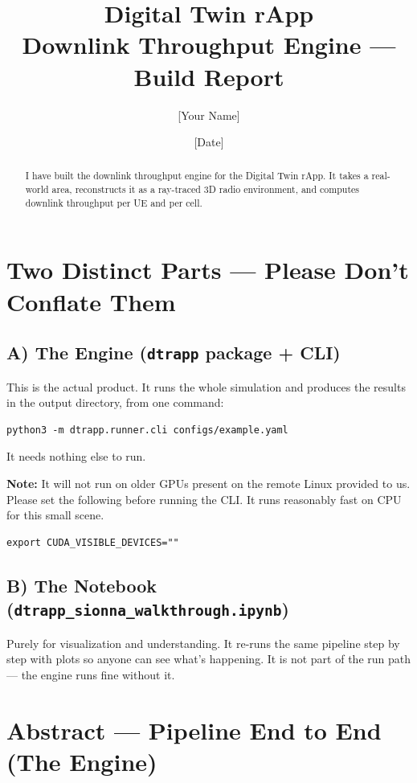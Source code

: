 \documentclass[11pt]{article}
\title{Digital Twin rApp\\[2pt]\large Downlink Throughput Engine --- Build Report}
\author{[Your Name] \\ [Team / Group]}
\date{[Date]}
\begin{document}
\maketitle

\begin{abstract}
I have built the downlink throughput engine for the Digital Twin rApp. It takes a
real-world area, reconstructs it as a ray-traced 3D radio environment, and
computes downlink throughput per UE and per cell.
\end{abstract}

\section{Two Distinct Parts --- Please Don't Conflate Them}

\subsection*{A) The Engine (\texttt{dtrapp} package + CLI)}
This is the actual product. It runs the whole simulation and produces the results
in the output directory, from one command:
\begin{verbatim}
python3 -m dtrapp.runner.cli configs/example.yaml
\end{verbatim}
It needs nothing else to run.

\smallskip
\noindent\textbf{Note:} It will not run on older GPUs present on the remote Linux
provided to us. Please set the following before running the CLI. It runs
reasonably fast on CPU for this small scene.
\begin{verbatim}
export CUDA_VISIBLE_DEVICES=""
\end{verbatim}

\subsection*{B) The Notebook (\texttt{dtrapp\_sionna\_walkthrough.ipynb})}
Purely for visualization and understanding. It re-runs the same pipeline step by
step with plots so anyone can see what's happening. It is not part of the run
path --- the engine runs fine without it.

\section{Abstract --- Pipeline End to End (The Engine)}
\end{document}
